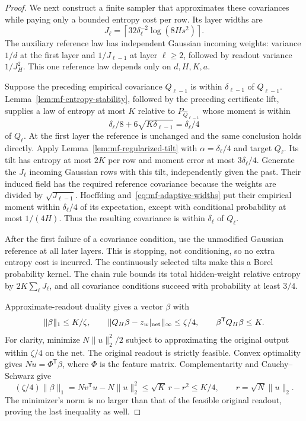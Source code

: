 \begin{proof}
We next construct a finite sampler that approximates these covariances
while paying only a bounded entropy cost per row.  Its layer widths are
\begin{equation}
 J_\ell=\left\lceil32\delta_\ell^{-2}\log(8Hs^2)\right\rceil.
 \label{eq:mf-adaptive-widths}
\end{equation}
The auxiliary reference law has independent Gaussian incoming weights:
variance $1/d$ at the first layer and $1/J_{\ell-1}$ at layer
$\ell\geq2$, followed by readout variance $1/J_H^2$.
This one reference law depends only on $d,H,K,a$.

Suppose the preceding empirical covariance $\widehat Q_{\ell-1}$
is within $\delta_{\ell-1}$ of $Q_{\ell-1}$.
Lemma~\ref{lem:mf-entropy-stability}, followed by the preceding
certificate lift, supplies a law of entropy at most $K$ relative to
$P_{\widehat Q_{\ell-1}}$ whose moment is within
\[
 \delta_\ell/8+6\sqrt{K\delta_{\ell-1}}
       =\delta_\ell/4
\]
of $Q_\ell$.  At the first layer the reference is unchanged and the
same conclusion holds directly.
Apply Lemma~\ref{lem:mf-regularized-tilt} with
$\alpha=\delta_\ell/4$ and target $Q_\ell$.
Its tilt has entropy at most $2K$ per row and moment error at most
$3\delta_\ell/4$.
Generate the $J_\ell$ incoming Gaussian rows with this tilt,
independently given the past.  Their induced field has the required
reference covariance because the weights are divided by
$\sqrt{J_{\ell-1}}$.
Hoeffding and~\eqref{eq:mf-adaptive-widths} put their empirical moment
within $\delta_\ell/4$ of its expectation, except with conditional
probability at most $1/(4H)$.  Thus the resulting covariance is within
$\delta_\ell$ of $Q_\ell$.

After the first failure of a covariance condition, use the unmodified
Gaussian reference at all later layers.  This is stopping, not
conditioning, so no extra entropy cost is incurred.
The continuously selected tilts make this a Borel probability kernel.
The chain rule bounds its total hidden-weight relative entropy by
$2K\sum_\ell J_\ell$, and all covariance conditions succeed with
probability at least $3/4$.

Approximate-readout duality gives a vector $\beta$ with
\[
 \|\beta\|_1\leq K/\zeta,\qquad
 \|Q_H\beta-z_w|_{\rm net}\|_\infty\leq\zeta/4,
 \qquad \beta^{\mathsf T}Q_H\beta\leq K.
\]
For clarity, minimize $N\|u\|_2^2/2$ subject to approximating the
original output within $\zeta/4$ on the net.
The original readout is strictly feasible.  Convex optimality gives
$Nu=\Phi^{\mathsf T}\beta$, where $\Phi$ is the feature matrix.
Complementarity and Cauchy--Schwarz give
\[
 (\zeta/4)\|\beta\|_1=Nv^{\mathsf T}u-N\|u\|_2^2
 \leq\sqrt K\,r-r^2\leq K/4,\qquad r=\sqrt N\|u\|_2.
\]
The minimizer's norm is no larger than that of the feasible original
readout, proving the last inequality as well.


\end{proof}
